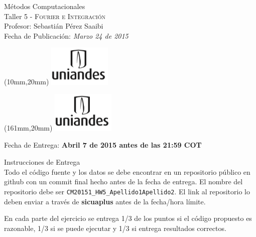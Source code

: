 \documentclass[11pt,letterpaper]{exam}
\begin{document}
\begin{center}
{\Large Métodos Computacionales} \\
Taller 5 - \textsc{Fourier e Integración} \\
Profesor: Sebastián Pérez Saaibi\\
Fecha de Publicación: {\small \it Marzo 24 de 2015}\\
\end{center}

\begin{textblock*}{40mm}(10mm,20mm)
  \includegraphics[width=3cm]{logoUniandes.png}
\end{textblock*}

\begin{textblock*}{40mm}(161mm,20mm)
  \includegraphics[width=3cm]{logoUniandes.png}
\end{textblock*}

\vspace{0.5cm}

{\Large Fecha de Entrega:  \bf Abril 7 de 2015 antes de las 21:59 COT}

\vspace{0.5cm}

{\Large Instrucciones de Entrega}\\


Todo el código fuente y los datos se debe encontrar en un repositorio público en github con un commit final hecho antes de la fecha de entrega. El nombre del repositorio debe ser \newline \verb+CM20151_HW5_Apellido1Apellido2+. El link al repositorio lo deben enviar a través de \textbf{sicuaplus} antes de la fecha/hora límite.

En cada parte del ejercicio se entrega 1/3 de los puntos si el código propuesto es razonable, 1/3 si se puede ejecutar y 1/3 si entrega resultados correctos.

\vspace{0.5cm}
\end{document}
